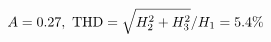 \documentclass[preview]{standalone}
\begin{document}
\begin{align*}
\special{dvisvgm:raw <g id='unique000'>}A=0.27,\ \text{THD}=\sqrt{H_2^2+H_3^2}/H_1=5.4\%\special{dvisvgm:raw </g>}
\end{align*}
\end{document}
